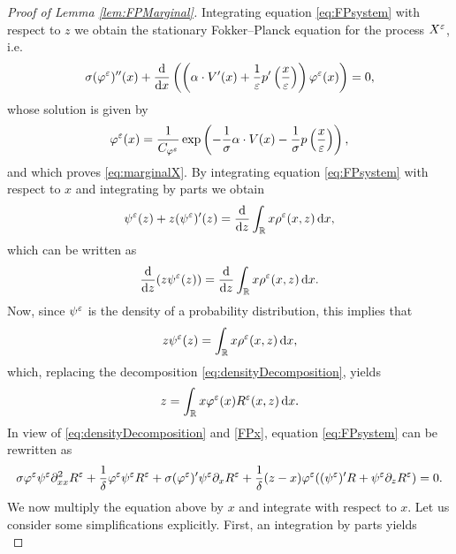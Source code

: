 \documentclass[10pt]{article}
\begin{document}
\begin{appendices}
\begin{proof}[Proof of Lemma \ref{lem:FPMarginal}] Integrating equation \eqref{eq:FPsystem} with respect to $z$ we obtain the stationary Fokker--Planck equation for the process $X^\varepsilon$, i.e.
	\begin{equation}
	\label{FPx}
	\sigma (\varphi^\varepsilon)''(x) + \frac{\mathrm{d}}{\mathrm{d} x} \left( \left ( \alpha \cdot V'(x) + \frac{1}{\varepsilon} p' \left ( \frac{x}{\varepsilon} \right ) \right ) \varphi^\varepsilon(x)\right) = 0,
	\end{equation}
	whose solution is given by
	\begin{equation}
	\varphi^\varepsilon(x) = \frac{1}{C_{\varphi^\varepsilon}} \exp\left(- \frac{1}{\sigma} \alpha \cdot V(x) - \frac{1}{\sigma} p \left ( \frac{x}{\varepsilon} \right )\right),
	\end{equation}
	and which proves \eqref{eq:marginalX}. By integrating equation \eqref{eq:FPsystem} with respect to $x$ and integrating by parts we obtain
	\begin{equation}
	\psi^\varepsilon(z) + z (\psi^\varepsilon)'(z) = \frac{\mathrm{d}}{\mathrm{d} z} \int_{\mathbb{R}} x \rho^\varepsilon(x,z) \,\mathrm{d} x,
	\end{equation}
	which can be written as
	\begin{equation}
	\frac{\mathrm{d}}{\mathrm{d} z} (z \psi^\varepsilon(z)) = \frac{\mathrm{d}}{\mathrm{d} z} \int_{\mathbb{R}} x \rho^\varepsilon(x,z) \,\mathrm{d} x.
	\end{equation}
	Now, since $\psi^\varepsilon$ is the density of a probability distribution, this implies that 
	\begin{equation}\label{FPz}
	z \psi^\varepsilon(z) = \int_{\mathbb{R}} x \rho^\varepsilon(x,z) \,\mathrm{d} x,
	\end{equation}
	which, replacing the decomposition \eqref{eq:densityDecomposition}, yields
	\begin{equation} \label{eq:z_condition}
	z = \int_{\mathbb{R}} x \varphi^\varepsilon(x) R^\varepsilon(x,z) \,\mathrm{d} x.
	\end{equation}
	In view of \eqref{eq:densityDecomposition} and \eqref{FPx}, equation \eqref{eq:FPsystem} can be rewritten as
	\begin{equation}\label{eq:psiEqualityPDE}
	\sigma \varphi^\varepsilon \psi^\varepsilon \partial^2_{xx} R^\varepsilon + \frac{1}{\delta} \varphi^\varepsilon \psi^\varepsilon R^\varepsilon + \sigma (\varphi^\varepsilon)' \psi^\varepsilon \partial_x R^\varepsilon + \frac{1}{\delta} (z-x) \varphi^\varepsilon ((\psi^\varepsilon)' R + \psi^\varepsilon \partial_z R^\varepsilon) = 0.
	\end{equation}
	We now multiply the equation above by $x$ and integrate with respect to $x$. Let us consider some simplifications explicitly. First, an integration by parts yields
	\begin{equation}\label{eq:psiEqualityPDE_1}

\end{equation}
\end{proof}
\end{appendices}
\end{document}
